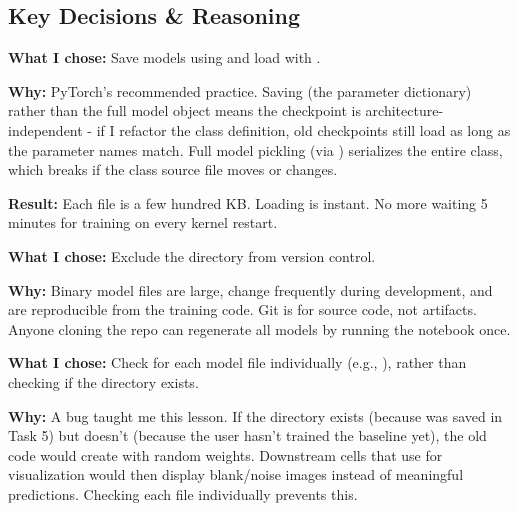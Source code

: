 \documentclass[9pt,a4paper,twocolumn,twoside]{tau-class/tau}
\begin{document}
    \subsection{Key Decisions \& Reasoning}

        \begin{tauenv}[frametitle={Decision: PyTorch \texttt{.pt} Checkpoints, Not Pickle}]
            \textbf{What I chose:} Save models using  and load with .

            \textbf{Why:} PyTorch's recommended practice. Saving  (the parameter dictionary) rather than the full model object means the checkpoint is architecture-independent - if I refactor the class definition, old checkpoints still load as long as the parameter names match. Full model pickling (via ) serializes the entire class, which breaks if the class source file moves or changes.

            \textbf{Result:} Each  file is a few hundred KB. Loading is instant. No more waiting 5 minutes for training on every kernel restart.
        \end{tauenv}

        \begin{tauenv}[frametitle={Decision: Add \texttt{models/} to \texttt{.gitignore}}]
            \textbf{What I chose:} Exclude the  directory from version control.

            \textbf{Why:} Binary model files are large, change frequently during development, and are reproducible from the training code. Git is for source code, not artifacts. Anyone cloning the repo can regenerate all models by running the notebook once.
        \end{tauenv}

        \begin{tauenv}[frametitle={Decision: Check Individual Checkpoint Files, Not Directory}]
            \textbf{What I chose:} Check  for each model file individually (e.g., ), rather than checking if the  directory exists.

            \textbf{Why:} A bug taught me this lesson. If the directory exists (because  was saved in Task 5) but  doesn't (because the user hasn't trained the baseline yet), the old code would create  with random weights. Downstream cells that use  for visualization would then display blank/noise images instead of meaningful predictions. Checking each file individually prevents this.
        \end{tauenv}
\end{document}
